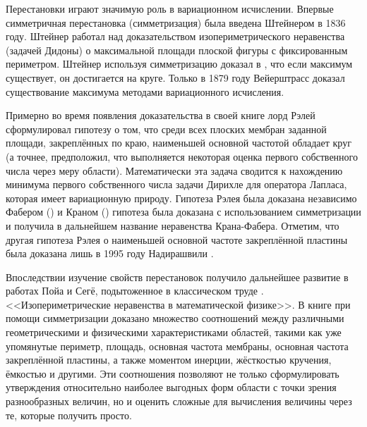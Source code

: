 {\actuality}




Перестановки играют значимую роль в вариационном исчислении.
Впервые симметричная перестановка (симметризация) была введена Штейнером в 1836 году.
Штейнер работал над доказательством изопериметрического неравенства (задачей Дидоны)
о максимальной площади плоской фигуры с фиксированным периметром.
Штейнер используя симметризацию доказал в \cite{Steiner}, что если максимум существует, он достигается на круге.
Только в 1879 году Вейерштрасс доказал существование максимума методами вариационного исчисления.

Примерно во время появления доказательства в своей книге \cite{Rayleigh} лорд Рэлей сформулировал гипотезу
о том, что среди всех плоских мембран заданной площади, закреплённых по краю, наименьшей основной частотой обладает круг
(а точнее, предположил, что выполняется некоторая оценка первого собственного числа через меру области).
Математически эта задача сводится к нахождению минимума первого собственного числа задачи Дирихле для оператора Лапласа,
которая имеет вариационную природу.
Гипотеза Рэлея была доказана независимо Фабером (\cite{Faber}) и Краном (\cite{Krahn}) гипотеза была доказана
с использованием симметризации и получила в дальнейшем название неравенства Крана-Фабера.
Отметим, что другая гипотеза Рэлея о наименьшей основной частоте закреплённой пластины
была доказана лишь в 1995 году Надирашвили \cite{Nadirashvili}.

Впоследствии изучение свойств перестановок получило дальнейшее развитие в работах Пойа и Сегё, подытоженное в классическом труде \cite{PS_book}.
<<Изопериметрические неравенства в математической физике>>.
В книге при помощи симметризации доказано множество соотношений между различными геометрическими и физическими характеристиками областей,
такими как уже упомянутые периметр, площадь, основная частота мембраны, основная частота закреплённой пластины,
а также моментом инерции, жёсткостью кручения, ёмкостью и другими.
Эти соотношения позволяют не только сформулировать утверждения относительно наиболее выгодных форм области
с точки зрения разнообразных величин,
но и оценить сложные для вычисления величины через те, которые получить просто.

